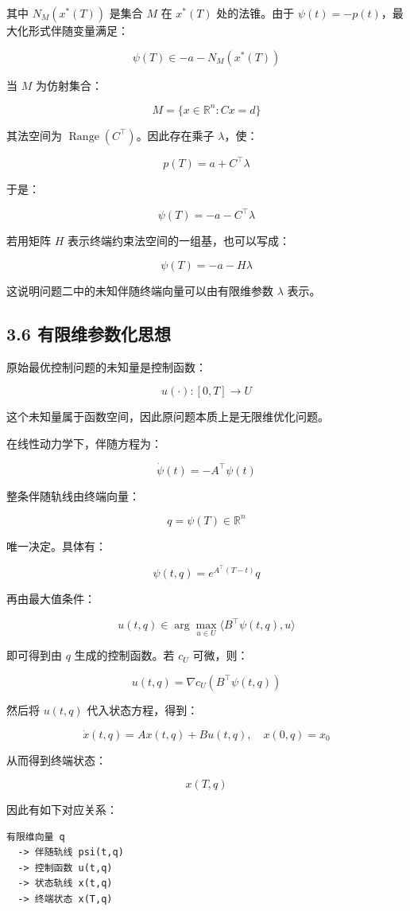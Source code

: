 \documentclass[UTF8,a4paper,zihao=-4]{ctexart}
\begin{document}
其中 $N_M(x^*(T))$ 是集合 $M$ 在 $x^*(T)$ 处的法锥。由于 $\psi(t)=-p(t)$，最大化形式伴随变量满足：

\[
\psi(T)\in -a-N_M(x^*(T))
\]

当 $M$ 为仿射集合：

\[
M=\{x\in\mathbb{R}^n:Cx=d\}
\]

其法空间为 $\operatorname{Range}(C^\top)$。因此存在乘子 $\lambda$，使：

\[
p(T)=a+C^\top\lambda
\]

于是：

\[
\psi(T)=-a-C^\top\lambda
\]

若用矩阵 $H$ 表示终端约束法空间的一组基，也可以写成：

\[
\psi(T)=-a-H\lambda
\]

这说明问题二中的未知伴随终端向量可以由有限维参数 $\lambda$ 表示。

\subsection{3.6 有限维参数化思想}

原始最优控制问题的未知量是控制函数：

\[
u(\cdot):[0,T]\to U
\]

这个未知量属于函数空间，因此原问题本质上是无限维优化问题。

在线性动力学下，伴随方程为\cite[第23--27页]{pontryagin1969}\cite[第5--7页]{avvakumov1995}：

\[
\dot{\psi}(t)=-A^\top\psi(t)
\]

整条伴随轨线由终端向量：

\[
q=\psi(T)\in\mathbb{R}^n
\]

唯一决定。具体有：

\[
\psi(t,q)=e^{A^\top(T-t)}q
\]

再由最大值条件：

\[
u(t,q)\in\arg\max_{u\in U}
\langle B^\top\psi(t,q),u\rangle
\]

即可得到由 $q$ 生成的控制函数。若 $c_U$ 可微，则：

\[
u(t,q)=\nabla c_U(B^\top\psi(t,q))
\]

然后将 $u(t,q)$ 代入状态方程，得到：

\[
\dot{x}(t,q)=Ax(t,q)+Bu(t,q),\quad x(0,q)=x_0
\]

从而得到终端状态：

\[
x(T,q)
\]

因此有如下对应关系：

\begin{verbatim}
有限维向量 q
  -> 伴随轨线 psi(t,q)
  -> 控制函数 u(t,q)
  -> 状态轨线 x(t,q)
  -> 终端状态 x(T,q)
\end{verbatim}
\end{document}
